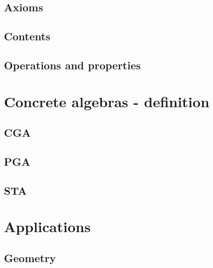\subsection{Axioms}

\subsection{Contents}



\subsection{Operations and properties}

\section{Concrete algebras - definition}

\subsection{CGA}

\subsection{PGA}

\subsection{STA}

\section{Applications}

\subsection{Geometry}

\ifplastex
\else

\fi

